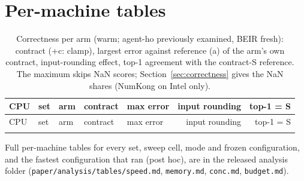 \section{Per-machine tables}
\label{app:tables}

\begin{small}
\setlength{\tabcolsep}{4pt}
\begin{longtable}{lllllrr}
\caption{Correctness per arm (warm; agent-ho previously examined, BEIR fresh): contract (+c: clamp), largest error against reference (a) of the arm's own contract, input-rounding effect, top-1 agreement with the contract-S reference. The maximum skips NaN scores; Section~\ref{sec:correctness} gives the NaN shares (NumKong on Intel only).}\label{tab:correctness}\\
\toprule
CPU & set & arm & contract & max error & input rounding & top-1 = S \\
\midrule
\endfirsthead
\toprule
CPU & set & arm & contract & max error & input rounding & top-1 = S \\
\midrule
\endhead
{}{tables/correctness.tex}
\bottomrule
\end{longtable}
\end{small}

Full per-machine tables for every set, sweep cell, mode and frozen configuration, and the fastest configuration that ran (post hoc), are in the released analysis folder (\texttt{paper/analysis/tables/speed.md}, \texttt{memory.md}, \texttt{conc.md}, \texttt{budget.md}).
